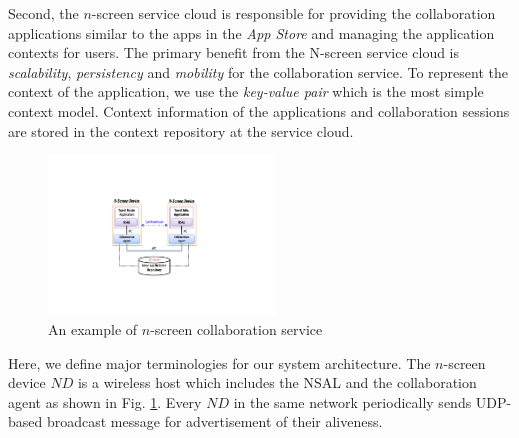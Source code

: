 \documentclass[conference]{IEEEtran}
\begin{document}
Second,  the $n$-screen service cloud is responsible for providing the collaboration applications similar to the apps in the \textit{App Store} and managing the application contexts  for users. 
The primary benefit from the N-screen service cloud is \textit{scalability}, \textit{persistency} and \textit{mobility} for the collaboration service. 
 To represent the context of the application, we use the \textit{key-value pair} which is the most simple context model. Context information of the applications and collaboration sessions are stored in the context repository at the service cloud.



    \begin{figure}[htb] %
    \centering
    \includegraphics[width=6cm,keepaspectratio]{basicmodel}
    \caption{An example of $n$-screen collaboration service}
    \label{fig:basicmodel}
    \end{figure}


Here, we define major terminologies for our system architecture. The $n$-screen device $ND$ is a wireless host which includes the NSAL and the collaboration agent as shown in Fig. \ref{fig:basicmodel}.  Every $ND$ in the same network periodically sends UDP-based broadcast message for advertisement of their aliveness.\\
\end{document}
